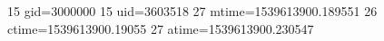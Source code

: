 15 gid=3000000
15 uid=3603518
27 mtime=1539613900.189551
26 ctime=1539613900.19055
27 atime=1539613900.230547
